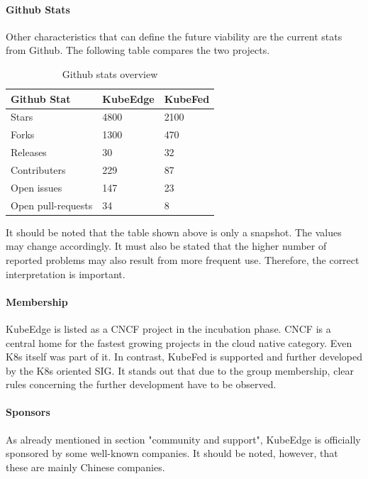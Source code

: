 \documentclass[MIC,Master,english]{twbook}%
\begin{document}
\paragraph{Github Stats} Other characteristics that can define the future viability are the current stats from Github. The following table compares the two projects.

\begin{table}[ht]
    \begin{center}
        \begin{tabular}{|l|l|l|}
            \hline
            Github Stat & \textbf{KubeEdge} & \textbf{KubeFed} \\
            \hline
            Stars & 4800 & 2100 \\
            Forks & 1300 & 470 \\
            Releases & 30 & 32 \\
            Contributers & 229 & 87 \\
            Open issues & 147 & 23 \\
            Open pull-requests & 34 & 8 \\
            \hline
        \end{tabular}
        \caption{Github stats overview}
        \label{tab:gh-stats}
    \end{center}
\end{table}

It should be noted that the table shown above is only a snapshot. The values may change accordingly. It must also be stated that the higher number of reported problems may also result from more frequent use. Therefore, the correct interpretation is important.

\paragraph{Membership} KubeEdge is listed as a \ac{CNCF} project in the incubation phase. \ac{CNCF} is a central home for the fastest growing projects in the cloud native category. Even \ac{K8s} itself was part of it. In contrast, KubeFed is supported and further developed by the \ac{K8s} oriented \ac{SIG}. It stands out that due to the group membership, clear rules concerning the further development have to be observed.

\paragraph{Sponsors} As already mentioned in section "community and support", KubeEdge is officially sponsored by some well-known companies. It should be noted, however, that these are mainly Chinese companies.
\end{document}
